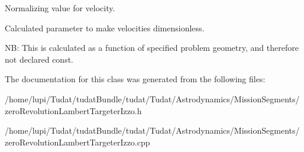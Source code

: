 Normalizing value for velocity. 

Calculated parameter to make velocities dimensionless.

NB\+: This is calculated as a function of specified problem geometry, and therefore not declared const. 

The documentation for this class was generated from the following files\+:\begin{DoxyCompactItemize}
\item 
/home/lupi/\+Tudat/tudat\+Bundle/tudat/\+Tudat/\+Astrodynamics/\+Mission\+Segments/zero\+Revolution\+Lambert\+Targeter\+Izzo.\+h\item 
/home/lupi/\+Tudat/tudat\+Bundle/tudat/\+Tudat/\+Astrodynamics/\+Mission\+Segments/zero\+Revolution\+Lambert\+Targeter\+Izzo.\+cpp\end{DoxyCompactItemize}
